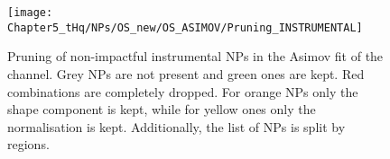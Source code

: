 \begin{comment}
In the SR and CR(\ttbar) the \tHq PDF NPs are kept in most of cases either in shape or normalisation,
this is due to the density of \tHq events in these two regions. Meanwhile, for the CR(\Zjets) this is not
the case where either shape or the entire NP is dropped, as
Figure~\ref{fig:Appendix:AdditionalResults:OS:Asimov:Pruning:tHqPDF} illustrates.

Regarding the modelling, as Figure~\ref{fig:Appendix:AdditionalResults:OS:Asimov:Pruning:ttWPDF}
shows, the normalisation of NPs of the PDFs of the \ttW process are kept in the SR and
the CR(\ttbar) but both normalisation and shape are impactful in the CR(\Zjets). For \tZq PDFs,
Figure~\ref{fig:Appendix:AdditionalResults:OS:Asimov:Pruning:tZqPDF} manifests how
the related NPs are mostly dropped. The shape of the NPs for the PDFs of the \ttH process 
is dropped in all cases as Figure~\ref{fig:Appendix:AdditionalResults:OS:Asimov:Pruning:ttHPDF}
exhibits. With \ttZ PDFs, in Figure~\ref{fig:Appendix:AdditionalResults:OS:Asimov:Pruning:ttZPDF},
there is a similar behaviour as for \tZq.
For \ttbar, the most important background this channel, all except one NPs related to its PDFs are dropped as
Figure~\ref{fig:Appendix:AdditionalResults:OS:Asimov:Pruning:ttbarPDF} shows. Finally, for the
diboson PDFs, the shape of its NPs is dropped most of times (see 
Figure~\ref{fig:Appendix:AdditionalResults:OS:Asimov:Pruning:DibosonPDF}).
\end{comment}


\begin{figure}[h]
  \centering
  \texttt{[image: Chapter5\_tHq/NPs/OS\_new/OS\_ASIMOV/Pruning\_INSTRUMENTAL]}	
   \caption{Pruning of non-impactful instrumental NPs in the Asimov fit of the \dilepOStau channel. Grey NPs are 
   not present and green ones are kept. Red combinations are completely dropped. For orange NPs only the shape 
   component is kept, while for yellow ones only the normalisation is kept. Additionally, the list of NPs is split by regions.}
  \label{fig:Appendix:AdditionalResults:OS:Asimov:Pruning:instrumental_general}
\end{figure}



